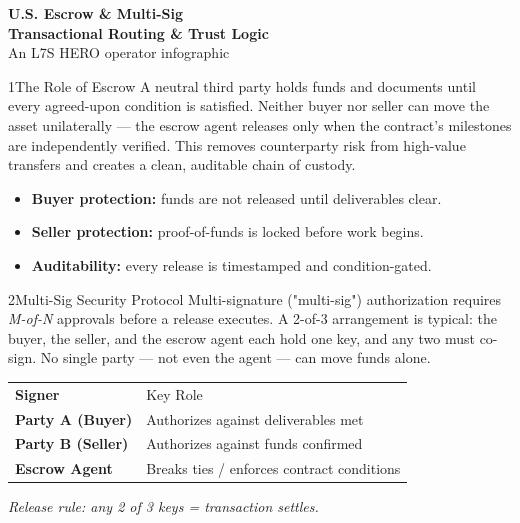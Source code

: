 \documentclass[11pt]{article}
\begin{document}
\begin{center}
  {\color{L7Sblack}\bfseries\Huge U.S. Escrow \& Multi-Sig}\\[2pt]
  {\color{L7Sgold}\bfseries\large Transactional Routing \& Trust Logic}\\[4pt]
  {\color{L7Sblack!55}\small An L7S HERO operator infographic}
\end{center}
\vspace{6pt}

\begin{goldbox}{1\quad The Role of Escrow}
A neutral third party holds funds and documents until every agreed-upon
condition is satisfied. Neither buyer nor seller can move the asset
unilaterally — the escrow agent releases only when the contract's
milestones are independently verified. This removes counterparty risk
from high-value transfers and creates a clean, auditable chain of custody.
\begin{itemize}[leftmargin=1.4em,itemsep=2pt]
  \item \textbf{Buyer protection:} funds are not released until deliverables clear.
  \item \textbf{Seller protection:} proof-of-funds is locked before work begins.
  \item \textbf{Auditability:} every release is timestamped and condition-gated.
\end{itemize}
\end{goldbox}

\begin{goldbox}{2\quad Multi-Sig Security Protocol}
Multi-signature ("multi-sig") authorization requires \emph{M-of-N}
approvals before a release executes. A 2-of-3 arrangement is typical:
the buyer, the seller, and the escrow agent each hold one key, and any
two must co-sign. No single party — not even the agent — can move funds alone.
\begin{center}
\renewcommand{\arraystretch}{1.4}
\begin{tabular}{>{\bfseries}l l}
\rowcolor{L7Sgoldsoft} Signer & Key Role \\
Party A (Buyer)  & Authorizes against deliverables met \\
Party B (Seller) & Authorizes against funds confirmed \\
Escrow Agent     & Breaks ties / enforces contract conditions \\
\end{tabular}
\end{center}
\textit{Release rule: any 2 of 3 keys = transaction settles.}
\end{goldbox}
\end{document}
